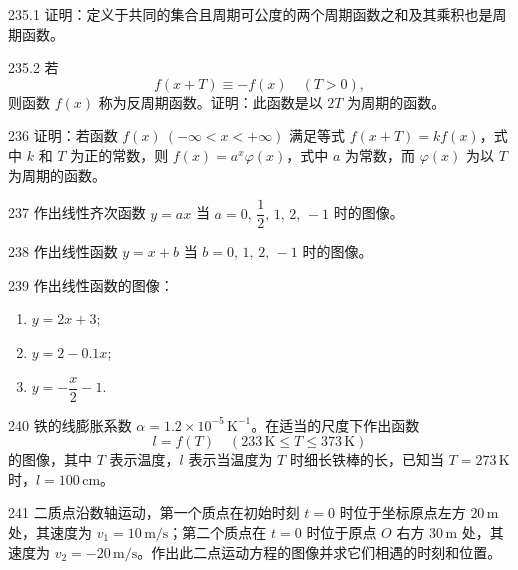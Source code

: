 \begin{prob}[M]{235.1}
证明：定义于共同的集合且周期可公度的两个周期函数之和及其乘积也是周期函数。
\end{prob}

\begin{prob}[M]{235.2}
若
\[
f(x + T) \equiv -f(x) \quad (T > 0),
\]
则函数 $f(x)$ 称为反周期函数。证明：此函数是以 $2T$ 为周期的函数。
\end{prob}

\begin{prob}[M]{236}
证明：若函数 $f(x)\ (-\infty < x < +\infty)$ 满足等式 $f(x + T) = kf(x)$，式中 $k$ 和 $T$ 为正的常数，则 $f(x) = a^x\varphi(x)$，式中 $a$ 为常数，而 $\varphi(x)$ 为以 $T$ 为周期的函数。
\end{prob}


\begin{prob}[M]{237}
作出线性齐次函数 $y = ax$ 当 $a = 0,\, \dfrac{1}{2},\, 1,\, 2,\, -1$ 时的图像。
\end{prob}

\begin{prob}[M]{238}
作出线性函数 $y = x + b$ 当 $b = 0,\, 1,\, 2,\, -1$ 时的图像。
\end{prob}

\begin{prob}[L]{239}
作出线性函数的图像：
\begin{enumerate}[label=(\alph*), itemsep=2pt, topsep=3pt]
\item $y = 2x + 3$;
\item $y = 2 - 0.1x$;
\item $y = -\dfrac{x}{2} - 1$.
\end{enumerate}
\end{prob}

\begin{prob}[M]{240}
铁的线膨胀系数 $\alpha = 1.2 \times 10^{-5}\,\mathrm{K}^{-1}$。在适当的尺度下作出函数
\[
l = f(T) \quad (233\,\mathrm{K} \leqslant T \leqslant 373\,\mathrm{K})
\]
的图像，其中 $T$ 表示温度，$l$ 表示当温度为 $T$ 时细长铁棒的长，已知当 $T = 273\,\mathrm{K}$ 时，$l = 100\,\mathrm{cm}$。
\end{prob}

\begin{prob}[M]{241}
二质点沿数轴运动，第一个质点在初始时刻 $t = 0$ 时位于坐标原点左方 $20\,\mathrm{m}$ 处，其速度为 $v_1 = 10\,\mathrm{m/s}$；第二个质点在 $t = 0$ 时位于原点 $O$ 右方 $30\,\mathrm{m}$ 处，其速度为 $v_2 = -20\,\mathrm{m/s}$。作出此二点运动方程的图像并求它们相遇的时刻和位置。
\end{prob}

